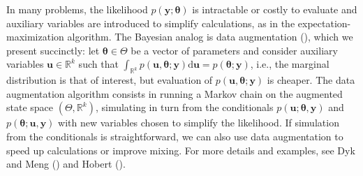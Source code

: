 \documentclass[
  11pt,
  letterpaper,
]{scrbook}
\theoremstyle{definition}
\theoremstyle{plain}
\theoremstyle{plain}
\theoremstyle{definition}
\theoremstyle{definition}
\theoremstyle{remark}
\begin{document}
In many problems, the likelihood
\(p(\boldsymbol{y}; \boldsymbol{\theta})\) is intractable or costly to
evaluate and auxiliary variables are introduced to simplify
calculations, as in the expectation-maximization algorithm. The Bayesian
analog is data augmentation (), which we present succinctly: let
\(\boldsymbol{\theta} \in \Theta\) be a vector of parameters and
consider auxiliary variables \(\boldsymbol{u} \in \mathbb{R}^k\) such
that
\(\int_{\mathbb{R}^k} p(\boldsymbol{u}, \boldsymbol{\theta}; \boldsymbol{y}) \mathrm{d} \boldsymbol{u} = p(\boldsymbol{\theta}; \boldsymbol{y})\),
i.e., the marginal distribution is that of interest, but evaluation of
\(p(\boldsymbol{u}, \boldsymbol{\theta}; \boldsymbol{y})\) is cheaper.
The data augmentation algorithm consists in running a Markov chain on
the augmented state space \((\Theta, \mathbb{R}^k)\), simulating in turn
from the conditionals
\(p(\boldsymbol{u}; \boldsymbol{\theta}, \boldsymbol{y})\) and
\(p(\boldsymbol{\theta}; \boldsymbol{u}, \boldsymbol{y})\) with new
variables chosen to simplify the likelihood. If simulation from the
conditionals is straightforward, we can also use data augmentation to
speed up calculations or improve mixing. For more details and examples,
see Dyk and Meng () and Hobert
().
\end{document}
